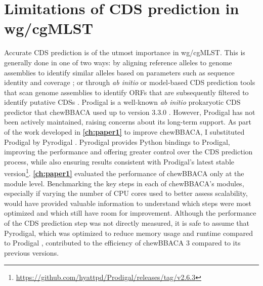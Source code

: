 \section{Limitations of CDS prediction in wg/cgMLST}

Accurate \ac{CDS} prediction is of the utmost importance in \ac{wg/cgMLST}. This is generally done in one of two ways: by aligning reference alleles to genome assemblies to identify similar alleles based on parameters such as sequence identity and coverage \cite{jolley_open-access_2018}; or through \textit{ab initio} or model-based \ac{CDS} prediction tools that scan genome assemblies to identify \ac{ORFs} that are subsequently filtered to identify putative \ac{CDSs} \cite{dimonaco_no_2022}. Prodigal is a well-known \textit{ab initio} prokaryotic \ac{CDS} predictor that chewBBACA used up to version 3.3.0 \cite{hyatt_prodigal_2010, silva_chewbbaca_2018}. However, Prodigal has not been actively maintained, raising concerns about its long-term support. As part of the work developed in \textbf{\autoref{ch:paper1}} to improve chewBBACA, I substituted Prodigal by Pyrodigal \cite{larralde_pyrodigal_2022}. Pyrodigal provides Python bindings to Prodigal, improving the performance and offering greater control over the \ac{CDS} prediction process, while also ensuring results consistent with Prodigal's latest stable version\footnote{\url{https://github.com/hyattpd/Prodigal/releases/tag/v2.6.3}}. \textbf{\autoref{ch:paper1}} evaluated the performance of chewBBACA only at the module level. Benchmarking the key steps in each of chewBBACA's modules, especially if varying the number of \ac{CPU} cores used to better assess scalability, would have provided valuable information to understand which steps were most optimized and which still have room for improvement. Although the performance of the \ac{CDS} prediction step was not directly measured, it is safe to assume that Pyrodigal, which was optimized to reduce memory usage and runtime compared to Prodigal \cite{larralde_pyrodigal_2022}, contributed to the efficiency of chewBBACA 3 compared to its previous versions.

